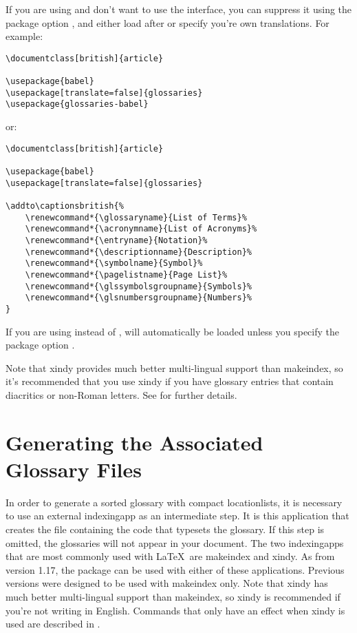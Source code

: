 \documentclass[report]{nlctdoc}
\begin{document}
If you are using  and don't want to use the
 interface, you can suppress it using the package
option , and either load
 after  or specify you're own
translations. For example:
\begin{verbatim}
\documentclass[british]{article}

\usepackage{babel}
\usepackage[translate=false]{glossaries}
\usepackage{glossaries-babel}
\end{verbatim}
or:
\begin{verbatim}
\documentclass[british]{article}

\usepackage{babel}
\usepackage[translate=false]{glossaries}

\addto\captionsbritish{%
    \renewcommand*{\glossaryname}{List of Terms}%
    \renewcommand*{\acronymname}{List of Acronyms}%
    \renewcommand*{\entryname}{Notation}%
    \renewcommand*{\descriptionname}{Description}%
    \renewcommand*{\symbolname}{Symbol}%
    \renewcommand*{\pagelistname}{Page List}%
    \renewcommand*{\glssymbolsgroupname}{Symbols}%
    \renewcommand*{\glsnumbersgroupname}{Numbers}%
}
\end{verbatim}

If you are using  instead of , 
 will automatically be loaded unless
you specify the package option .

Note that \gls{xindy} provides much better multi-lingual support
than \gls{makeindex}, so it's recommended that you use \gls*{xindy}
if you have glossary entries that contain diacritics or
non-Roman letters. See  for further
details.

\section{Generating the Associated Glossary Files}
\label{sec:makeglossaries}

In order to generate a sorted glossary with compact \glspl{locationlist},
it is necessary to use an external \gls{indexingapp} as an
intermediate step. It is this application that creates the file
containing the code that typesets the glossary. If this step is
omitted, the glossaries will not appear in your document. The two
\glspl*{indexingapp} that are most commonly used with \LaTeX\ are
\gls{makeindex} and \gls{xindy}. As from version 1.17, the
 package can be used with either of these
applications. Previous versions were designed to be used with
\gls*{makeindex} only. Note that \gls*{xindy} has much better
multi-lingual support than \gls*{makeindex}, so \gls*{xindy} is
recommended if you're not writing in English. Commands that only
have an effect when \gls*{xindy} is used are described in
.
\end{document}
